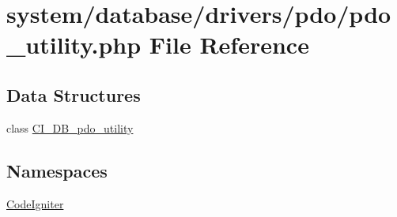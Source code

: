 \hypertarget{pdo__utility_8php}{\section{system/database/drivers/pdo/pdo\-\_\-utility.php File Reference}
\label{pdo__utility_8php}
}
\subsection*{Data Structures}
\begin{DoxyCompactItemize}
\item 
class \hyperlink{class_c_i___d_b__pdo__utility}{C\-I\-\_\-\-D\-B\-\_\-pdo\-\_\-utility}
\end{DoxyCompactItemize}
\subsection*{Namespaces}
\begin{DoxyCompactItemize}
\item 
\hyperlink{namespace_code_igniter}{Code\-Igniter}
\end{DoxyCompactItemize}
